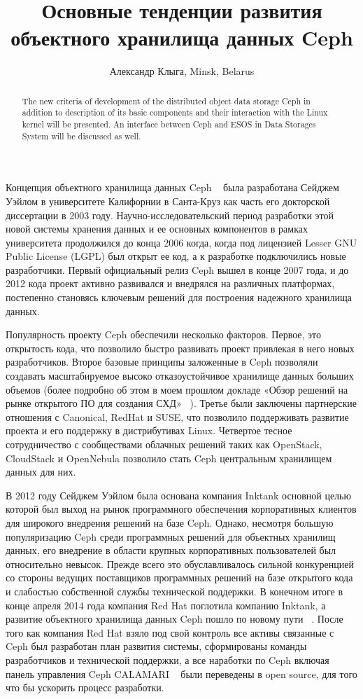 \documentclass[10pt, a5paper]{article}
\begin{document}
\title{Основные тенденции развития объектного хранилища данных Ceph}
\author{Александр Клыга, Minsk, Belarus}
\maketitle
\begin{abstract}
The new criteria of development of the distributed object data storage Ceph in addition to description of its basic components and their interaction with the Linux kernel will be presented. An interface between Ceph and ESOS in Data Storages System will be discussed as well.
\end{abstract}
Концепция объектного хранилища данных Ceph ~\cite{Kliga1} была разработана Сейджем Уэйлом в университете Калифорнии в Санта-Круз как часть его докторской диссертации в 2003 году. \linebreak Научно-исследовательский период разработки этой новой системы хранения данных и ее основных компонентов в рамках университета продолжился до конца 2006 когда, когда  под лицензией Lesser GNU Public License (LGPL) был открыт ее код, а к разработке подключились новые разработчики. Первый официальный релиз Ceph вышел в конце 2007 года, и до 2012 кода проект активно развивался и внедрялся на различных платформах, постепенно становясь ключевым решений для построения надежного хранилища данных.

Популярность проекту Ceph обеспечили несколько факторов. Первое, это открытость кода, что позволило быстро развивать проект привлекая в него новых разработчиков. Второе базовые принципы заложенные в Ceph позволяли создавать масштабируемое высоко отказоустойчивое  хранилище данных больших объемов (более подробно об этом в моем прошлом докладе «Обзор решений на рынке открытого ПО для создания СХД» ~\cite{Kliga2}). Третье были заключены  партнерские отношения с Canonical, RedHat и SUSE, что позволило поддерживать развитие проекта и его поддержку в дистрибутивах Linux. Четвертое тесное сотрудничество с сообществами облачных решений таких как OpenStack, CloudStack и OpenNebula позволило стать Ceph центральным хранилищем данных для них.

В 2012 году  Сейджем Уэйлом была основана компания  Inktank основной целью которой был выход на рынок программного обеспечения корпоративных клиентов для широкого внедрения решений на базе Ceph. Однако, несмотря  большую популяризацию  Ceph среди программных решений для объектных хранилищ данных, его внедрение в области крупных корпоративных пользователей был относительно невысок. Прежде всего это обуславливалось сильной конкуренцией со стороны ведущих поставщиков программных решений на базе открытого кода и слабостью собственной службы технической поддержки. В конечном итоге в конце апреля 2014 года компания Red Hat поглотила компанию Inktank, а развитие объектного хранилища данных Ceph пошло по новому пути ~\cite{Kliga3}. 
После того как компания Red Hat взяло под свой контроль все активы связанные с Ceph был разработан план развития системы, сформированы команды разработчиков и технической поддержки, а все наработки по Ceph включая  панель управления Ceph CALAMARI ~\cite{Kliga4} были переведены в open source, для того что бы ускорить процесс разработки.
\end{document}
